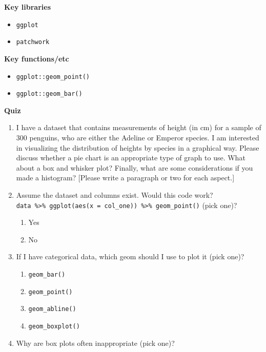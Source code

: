 \documentclass[
]{book}
\providecommand{\tightlist}{%
  \setlength{\itemsep}{0pt}\setlength{\parskip}{0pt}}
\begin{document}
\textbf{Key libraries}

\begin{itemize}
\tightlist
\item
  \texttt{ggplot}
\item
  \texttt{patchwork}
\end{itemize}

\textbf{Key functions/etc}

\begin{itemize}
\tightlist
\item
  \texttt{ggplot::geom\_point()}
\item
  \texttt{ggplot::geom\_bar()}
\end{itemize}

\textbf{Quiz}

\begin{enumerate}
\def\labelenumi{\arabic{enumi}.}
\tightlist
\item
  I have a dataset that contains measurements of height (in cm) for a sample of 300 penguins, who are either the Adeline or Emperor species. I am interested in visualizing the distribution of heights by species in a graphical way. Please discuss whether a pie chart is an appropriate type of graph to use. What about a box and whisker plot? Finally, what are some considerations if you made a histogram? {[}Please write a paragraph or two for each aspect.{]}
\item
  Assume the dataset and columns exist. Would this code work? \texttt{data\ \%\textgreater{}\%\ ggplot(aes(x\ =\ col\_one))\ \%\textgreater{}\%\ geom\_point()} (pick one)?

  \begin{enumerate}
  \def\labelenumii{\alph{enumii}.}
  \tightlist
  \item
    Yes
  \item
    No
  \end{enumerate}
\item
  If I have categorical data, which geom should I use to plot it (pick one)?

  \begin{enumerate}
  \def\labelenumii{\alph{enumii}.}
  \tightlist
  \item
    \texttt{geom\_bar()}
  \item
    \texttt{geom\_point()}
  \item
    \texttt{geom\_abline()}
  \item
    \texttt{geom\_boxplot()}
  \end{enumerate}
\item
  Why are box plots often inappropriate (pick one)?


\end{enumerate}
\end{document}
